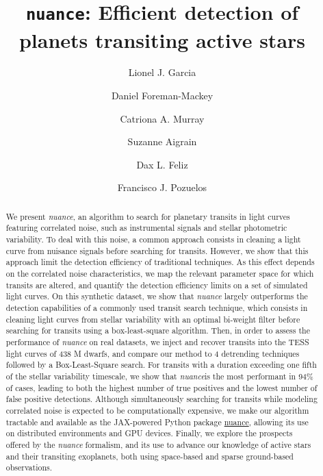 \documentclass[modern]{aastex631}
\newcommand{\nuancemethod}{\textit{nuance}}
\newcommand{\nuancecode}{\textsf{nuance}}
\begin{document}
\title{\texttt{nuance}: Efficient detection of planets transiting active stars}

\author{Lionel J. Garcia}
\author{Daniel Foreman-Mackey}
\author{Catriona A. Murray}
\author{Suzanne Aigrain}
\author{Dax L. Feliz}
\author{Francisco J. Pozuelos}


\begin{abstract}
    We present \nuancemethod{}, an algorithm to search for planetary transits in light curves featuring correlated noise, such as instrumental signals and stellar photometric variability. To deal with this noise, a common approach consists in cleaning a light curve from nuisance signals before searching for transits. However, we show that this approach limit the detection efficiency of traditional techniques. As this effect depends on the correlated noise characteristics, we map the relevant parameter space for which transits are altered, and quantify the detection efficiency limits on a set of simulated light curves. On this synthetic dataset, we show that \nuancemethod{} largely outperforms the detection capabilities of a commonly used transit search technique, which consists in cleaning light curves from stellar variability with an optimal bi-weight filter before searching for transits using a box-least-square algorithm. Then, in order to assess the performance of \nuancemethod{} on real datasets, we inject and recover transits into the TESS light curves of 438 M dwarfs, and compare our method to 4 detrending techniques followed by a Box-Least-Square search. For transits with a duration exceeding one fifth of the stellar variability timescale, we show that \nuancemethod is the most performant in 94\% of cases, leading to both the highest number of true positives and the lowest number of false positive detections. Although simultaneously searching for transits while modeling correlated noise is expected to be computationally expensive, we make our algorithm tractable and available as the \textsf{JAX}-powered Python package \href{https://github.com/lgrcia/nuance}{\nuancecode{}}, allowing its use on distributed environments and GPU devices. Finally, we explore the prospects offered by the \nuancemethod{} formalism, and its use to advance our knowledge of active stars and their transiting exoplanets, both using space-based and sparse ground-based observations.
\end{abstract}
\end{document}
